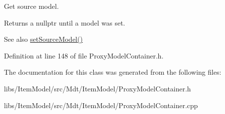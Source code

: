 Get source model. 

Returns a nullptr until a model was set.

\begin{DoxySeeAlso}{See also}
\hyperlink{class_mdt_1_1_item_model_1_1_proxy_model_container_a74f1afaa5c2002a6c0f7d31caed4fb2e}{set\+Source\+Model()} 
\end{DoxySeeAlso}


Definition at line 148 of file Proxy\+Model\+Container.\+h.



The documentation for this class was generated from the following files\+:\begin{DoxyCompactItemize}
\item 
libs/\+Item\+Model/src/\+Mdt/\+Item\+Model/Proxy\+Model\+Container.\+h\item 
libs/\+Item\+Model/src/\+Mdt/\+Item\+Model/Proxy\+Model\+Container.\+cpp\end{DoxyCompactItemize}
